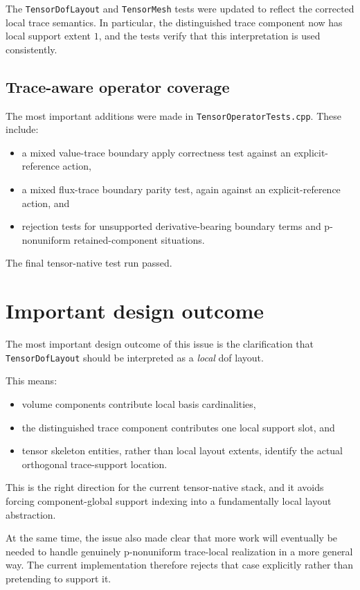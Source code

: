 \documentclass[11pt]{article}
\begin{document}
The \texttt{TensorDofLayout} and \texttt{TensorMesh} tests were updated to reflect the corrected local trace semantics. In particular, the distinguished trace component now has local support extent \(1\), and the tests verify that this interpretation is used consistently.

\subsection{Trace-aware operator coverage}

The most important additions were made in \texttt{TensorOperatorTests.cpp}. These include:
\begin{itemize}[leftmargin=*]
  \item a mixed value-trace boundary apply correctness test against an explicit-reference action,
  \item a mixed flux-trace boundary parity test, again against an explicit-reference action, and
  \item rejection tests for unsupported derivative-bearing boundary terms and p-nonuniform retained-component situations.
\end{itemize}

The final tensor-native test run passed.

\section{Important design outcome}

The most important design outcome of this issue is the clarification that \texttt{TensorDofLayout} should be interpreted as a \emph{local} dof layout.

This means:
\begin{itemize}[leftmargin=*]
  \item volume components contribute local basis cardinalities,
  \item the distinguished trace component contributes one local support slot, and
  \item tensor skeleton entities, rather than local layout extents, identify the actual orthogonal trace-support location.
\end{itemize}

This is the right direction for the current tensor-native stack, and it avoids forcing component-global support indexing into a fundamentally local layout abstraction.

At the same time, the issue also made clear that more work will eventually be needed to handle genuinely p-nonuniform trace-local realization in a more general way. The current implementation therefore rejects that case explicitly rather than pretending to support it.
\end{document}
